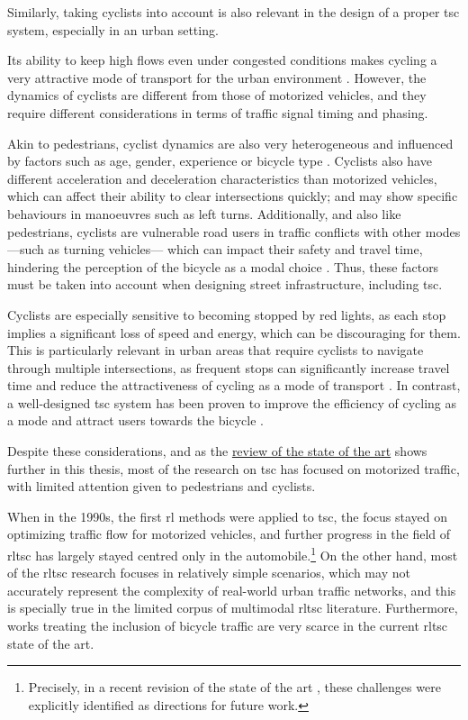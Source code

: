 \medskip

\noindent Similarly, taking cyclists into account is also relevant in the design of a proper \gls{tsc} system, especially in an urban setting.

Its ability to keep high flows even under congested conditions makes cycling a very attractive mode of transport for the urban environment \cite{Brunner2024}. However, the dynamics of cyclists are different from those of motorized vehicles, and they require different considerations in terms of traffic signal timing and phasing. 

Akin to pedestrians, cyclist dynamics are also very heterogeneous and influenced by factors such as age, gender, experience or bicycle type \cite{PérezCastro2025}. Cyclists also have different acceleration and deceleration characteristics than motorized vehicles, which can affect their ability to clear intersections quickly; and may show specific behaviours in manoeuvres such as left turns. Additionally, and also like pedestrians, cyclists are vulnerable road users in traffic conflicts with other modes —such as turning vehicles— which can impact their safety and travel time, hindering the perception of the bicycle as a modal choice \cite{Apostola2014}. Thus, these factors must be taken into account when designing street infrastructure, including \gls{tsc}.

Cyclists are especially sensitive to becoming stopped by red lights, as each stop implies a significant loss of speed and energy, which can be discouraging for them. This is particularly relevant in urban areas that require cyclists to navigate through multiple intersections, as frequent stops can significantly increase travel time and reduce the attractiveness of cycling as a mode of transport \cite{Apostola2014}. In contrast, a well-designed \gls{tsc} system has been proven to improve the efficiency of cycling as a mode and attract users towards the bicycle \cite{Aultman-Hall1997, Rietveld2004}.

\medskip

\noindent Despite these considerations, and as the \hyperref[subsec:bckg_sota]{review of the state of the art} shows further in this thesis, most of the research on \gls{tsc} has focused on motorized traffic, with limited attention given to pedestrians and cyclists.

When in the 1990s, the first \acrfull{rl} methods were applied to \gls{tsc}, the focus stayed on optimizing traffic flow for motorized vehicles, and further progress in the field of \acrfull{rltsc} has largely stayed centred only in the automobile.\footnote{Precisely, in a recent revision of the state of the art \cite{Xiao2024}, these challenges were explicitly identified as directions for future work.} On the other hand, most of the \gls{rltsc} research focuses in relatively simple scenarios, which may not accurately represent the complexity of real-world urban traffic networks, and this is specially true in the limited corpus of multimodal \gls{rltsc} literature. Furthermore, works treating the inclusion of bicycle traffic are very scarce in the current \gls{rltsc} state of the art.

